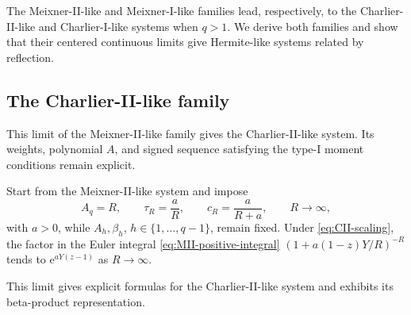 \documentclass[10pt]{amsart}
\newcommand{\e}{\mathrm e}
\theoremstyle{plain}
\theoremstyle{definition}
\theoremstyle{remark}
\begin{document}
The Meixner-II-like and Meixner-I-like families lead, respectively, to the
Charlier-II-like and Charlier-I-like systems when \(q>1\). We derive both
families and show that their centered continuous limits give Hermite-like
systems related by reflection.

\subsection{The Charlier-II-like family}

This limit of the Meixner-II-like family gives the Charlier-II-like system.
Its weights, polynomial \(A\), and signed sequence satisfying the type-I
moment conditions remain explicit.

Start from the Meixner-II-like system and impose
\begin{equation}
 A_q=R,\qquad \tau_R=\frac aR,
 \qquad c_R=\frac{a}{R+a},\qquad R\to\infty,
 \label{eq:CII-scaling}
\end{equation}
with \(a>0\), while \(A_h,\beta_h\),
\(h\in\{1,\ldots,q-1\}\), remain fixed. Under
\eqref{eq:CII-scaling}, the factor in the Euler integral
\eqref{eq:MII-positive-integral}
\((1+a(1-z)Y/R)^{-R}\) tends to \(\e^{aY(z-1)}\) as \(R\to\infty\).

This limit gives explicit formulas for the Charlier-II-like system and
exhibits its beta-product representation.
\end{document}
